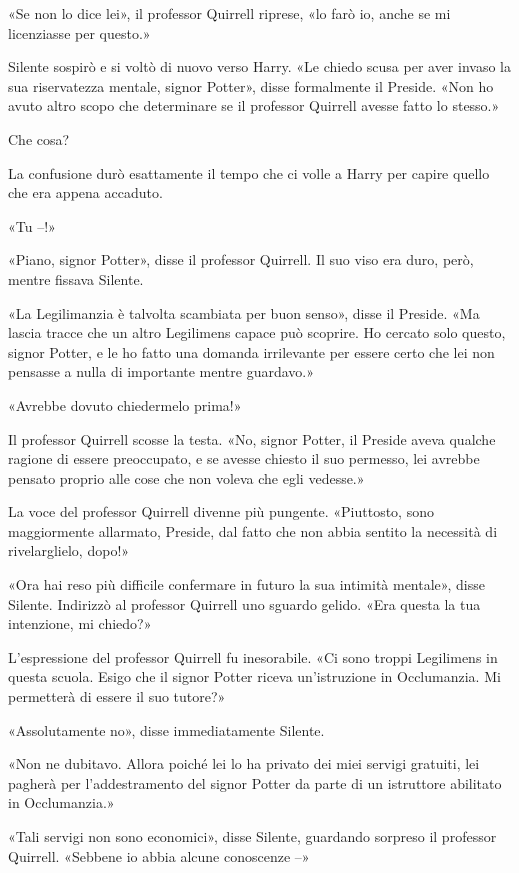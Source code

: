 «Se non lo dice lei», il professor Quirrell riprese, «lo farò io, anche se mi licenziasse per questo.»

Silente sospirò e si voltò di nuovo verso Harry. «Le chiedo scusa per aver invaso la sua riservatezza mentale, signor Potter», disse formalmente il Preside. «Non ho avuto altro scopo che determinare se il professor Quirrell avesse fatto lo stesso.»

Che cosa?

La confusione durò esattamente il tempo che ci volle a Harry per capire quello che era appena accaduto.

«Tu –!»

«Piano, signor Potter», disse il professor Quirrell. Il suo viso era duro, però, mentre fissava Silente.

«La Legilimanzia è talvolta scambiata per buon senso», disse il Preside. «Ma lascia tracce che un altro Legilimens capace può scoprire. Ho cercato solo questo, signor Potter, e le ho fatto una domanda irrilevante per essere certo che lei non pensasse a nulla di importante mentre guardavo.»

«Avrebbe dovuto chiedermelo prima!»

Il professor Quirrell scosse la testa. «No, signor Potter, il Preside aveva qualche ragione di essere preoccupato, e se avesse chiesto il suo permesso, lei avrebbe pensato proprio alle cose che non voleva che egli vedesse.»

La voce del professor Quirrell divenne più pungente. «Piuttosto, sono maggiormente allarmato, Preside, dal fatto che non abbia sentito la necessità di rivelarglielo, dopo!»

«Ora hai reso più difficile confermare in futuro la sua intimità mentale», disse Silente. Indirizzò al professor Quirrell uno sguardo gelido. «Era questa la tua intenzione, mi chiedo?»

L’espressione del professor Quirrell fu inesorabile. «Ci sono troppi Legilimens in questa scuola. Esigo che il signor Potter riceva un’istruzione in Occlumanzia. Mi permetterà di essere il suo tutore?»

«Assolutamente no», disse immediatamente Silente.

«Non ne dubitavo. Allora poiché lei lo ha privato dei miei servigi gratuiti, lei pagherà per l’addestramento del signor Potter da parte di un istruttore abilitato in Occlumanzia.»

«Tali servigi non sono economici», disse Silente, guardando sorpreso il professor Quirrell. «Sebbene io abbia alcune conoscenze –»

